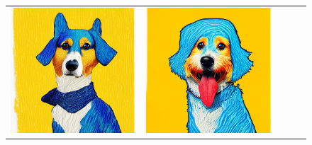 \begin{figure}[!ht]
\begin{tabular}[t]{c c c c c}
    \includegraphics[width=\xwidth]{cp2/figures/dreambooth/dog/c256_checkpoint_99.png} &
    \includegraphics[width=\xwidth]{cp2/figures/dreambooth/dog/c320_checkpoint_99.png} &

\end{tabular}
\end{figure}
